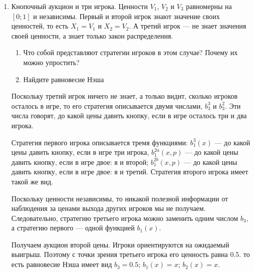 \begin{enumerate}



\item Кнопочный аукцион и три игрока. Ценности $ V_{1} $, $ V_{2} $ и $ V_{3} $ равномерны на $ [0;1] $ и независимы. Первый и второй игрок знают значение своих ценностей, то есть $ X_{1}=V_{1} $ и $ X_{2}=V_{2} $. А третий игрок — не знает значения своей ценности, а знает только закон распределения.
\begin{enumerate}
\item Что собой представляют стратегии игроков в этом случае? Почему их можно упростить?
\item Найдите равновесие Нэша
\end{enumerate}


Поскольку третий игрок ничего не знает, а только видит, сколько игроков осталось в игре, то его стратегия описывается двумя числами, $ b_{3}^{3} $ и $ b_{3}^{2} $. Эти числа говорят, до какой цены давить кнопку, если в игре осталось три и два игрока.

Стратегия первого игрока описывается тремя функциями: $ b_{1}^{3}(x) $ — до какой цены давить кнопку, если в игре три игрока, $b_{1}^{2a}(x,p)$ — до какой цены давить кнопку, если в игре двое: я и второй; $b_{1}^{2b}(x,p)$ — до какой цены давить кнопку, если в игре двое: я и третий. Стратегия второго игрока имеет такой же вид. 

Поскольку ценности независимы, то никакой полезной информации от наблюдения за ценами выхода других игроков мы не получаем. Следовательно, стратегию третьего игрока можно заменить одним числом $ b_{3} $, а стратегию первого — одной функцией $b_{1}(x)$.

Получаем аукцион второй цены. Игроки ориентируются на ожидаемый выигрыш. Поэтому с точки зрения третьего игрока его ценность равна 0.5. то есть равновесие Нэша имеет вид $ b_{3}=0.5 $; $ b_{1}(x)=x $; $ b_{2}(x)=x $.


\end{enumerate}

